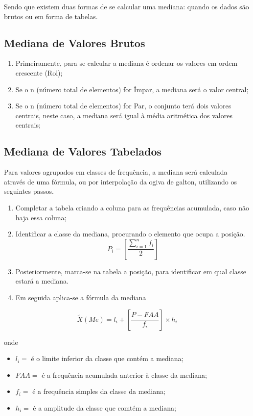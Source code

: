 Sendo que existem duas formas de se calcular uma mediana: quando os dados são brutos ou em forma de tabelas.\vskip0.3cm


\subsection{Mediana de Valores Brutos}


\begin{enumerate}
  \item Primeiramente, para se calcular a mediana é ordenar os valores em ordem crescente (Rol);
  \item Se o n (número total de elementos) for Ímpar, a mediana será o valor central;
  \item Se o n (número total de elementos) for Par, o conjunto terá dois valores centrais, neste caso, a mediana será igual à média aritmética dos valores centrais;
\end{enumerate}



\newpage
\subsection{Mediana de Valores Tabelados}


Para valores agrupados em classes de frequência, a mediana será calculada através de uma fórmula, ou por interpolação da ogiva de galton, utilizando os seguintes passos.



\begin{enumerate}
\item [{1°)}] Completar a tabela criando a coluna para as frequências acumulada, caso não haja essa coluna;
\item [{2°)}]Identificar a classe da mediana, procurando o elemento que ocupa a posição.
$$ P_{i} = \left[\frac{\sum_{i=1}^{n}f_{i}}{2} \right]  $$
\item [{3°)}] Posteriormente, marca-se na tabela a posição, para identificar em qual classe estará a mediana.
\item [{4°)}] Em seguida aplica-se a fórmula da mediana
\end{enumerate}

\begin{equation}\label{}
    \tilde{X}(Me)=l_{i}+\left[\frac{P-FAA}{f_{i}}\right]\times h_{i}
\end{equation}

 onde

 \begin{itemize}
   \item $l_{i}=$ é o limite inferior da classe que contém a mediana;
   \item $FAA=$ é a frequência acumulada anterior à classe da mediana;
   \item $f_{i}=$ é a frequência simples da classe da mediana;
   \item $h_{i}=$ é a amplitude da classe que comtém a mediana;
 \end{itemize}


